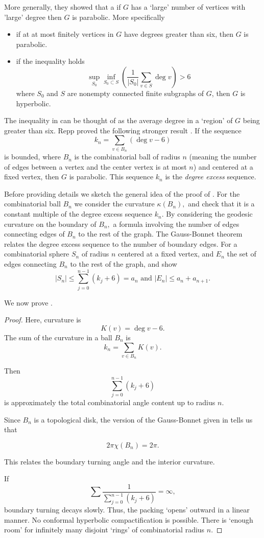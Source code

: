More generally,  they showed that a if $G$ has a `large' number of vertices with 'large' degree
then $G$ is parabolic. More specifically
\begin{itemize}
\item if at at most finitely vertices in $G$ have degrees greater than six, then $G$ is parabolic.
\item if the inequality holds
\begin{equation}\label{eqn:He-Sch-hyper}
\sup_{S_0}\inf_{S_0\subset S}\left(\frac{1}{|S_0|}\sum_{v\in S}\deg v \right)>6
\end{equation}
where $S_0$ and $S$ are nonempty connected finite subgraphs of $G$, then
$G$ is hyperbolic.
\end{itemize}
The inequality in  can be thought of as the average degree 
in a `region' of $G$ being greater than six.
Repp proved the following stronger result \cite{repp_bounded_2001}.
If the sequence
\begin{equation}\label{eqn:repp}
k_n=\sum_{v\in B_n}(\deg v - 6)
\end{equation}
is bounded, where $B_n$ is the combinatorial ball of radius $n$ (meaning the number of edges
between a vertex and the center vertex is at most $n$) and centered at a fixed vertex,
then $G$ is parabolic.
This sequence $k_n$ is the \emph{degree excess} sequence.



Before providing details we sketch the general idea of the proof of .
For the combinatorial ball $B_n$ we consider the curvature $\kappa(B_n),$ 
and check that it is a constant multiple of the degree excess sequence $k_n.$
By considering the geodesic curvature on the boundary of $B_n,$ 
a formula involving the number of edges connecting edges of $B_n$
to the rest of the graph.
The Gauss-Bonnet theorem relates the degree excess sequence to
the number of boundary edges. For a combinatorial sphere
$S_n$ of radius $n$ centered at a fixed vertex, and $E_n$ the set of edges
connecting $B_n$ to the rest of the graph, and show
$$|S_n|\leq \sum_{j=0}^{n-1}(k_j+6)=a_n \text{ and } |E_n|\leq a_n + a_{n+1}.$$

We now prove .

\begin{proof}
Here, curvature is
$$K(v)=\deg v - 6.$$
The sum of the curvature in a ball $B_n$ is
$$k_n=\sum_{v\in B_n}K(v).$$

Then $$\sum_{j=0}^{n-1}(k_j+6)$$ is approximately
the total combinatorial angle content up to radius $n.$

Since $B_n$ is a topological disk, the version of the Gauss-Bonnet
given in  tells us that 

$$2\pi \chi(B_n)=2\pi.$$

This relates the boundary turning angle and the interior curvature.

If
$$\sum \frac{1}{\sum_{j=0}^{n-1}(k_j+6)}=\infty,$$
boundary turning decays slowly.
Thus, the packing `opens' outward in a linear manner.
No conformal hyperbolic compactification is possible.
There is `enough room' for infinitely many disjoint `rings' of combinatorial
radius $n$.
\end{proof}

